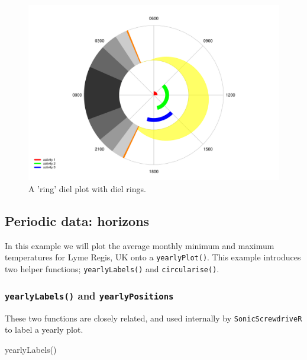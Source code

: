 \documentclass[
]{book}
\newenvironment{Shaded}{\begin{snugshade}}{\end{snugshade}}
\newcommand{\FunctionTok}[1]{\textcolor[rgb]{0.00,0.00,0.00}{#1}}
\newcommand{\NormalTok}[1]{#1}
\begin{document}
\begin{figure}

{\centering \includegraphics[width=0.9\linewidth]{_main_files/figure-latex/diel-plot-rings-2-1} 

}

\caption{A 'ring' diel plot with diel rings.}\label{fig:diel-plot-rings-2}
\end{figure}

\hypertarget{periodic-data-horizons}{%
\subsection{Periodic data: horizons}\label{periodic-data-horizons}}

In this example we will plot the average monthly minimum and maximum temperatures for Lyme Regis, UK onto a \texttt{yearlyPlot()}. This example introduces two helper functions; \texttt{yearlyLabels()} and \texttt{circularise()}.

\hypertarget{yearlylabels-and-yearlypositions}{%
\subsubsection{\texorpdfstring{\texttt{yearlyLabels()} and \texttt{yearlyPositions}}{yearlyLabels() and yearlyPositions}}\label{yearlylabels-and-yearlypositions}}

These two functions are closely related, and used internally by \texttt{SonicScrewdriveR} to label a yearly plot.

\begin{Shaded}
\begin{Highlighting}[]
\FunctionTok{yearlyLabels}\NormalTok{()}
\end{Highlighting}
\end{Shaded}
\end{document}
